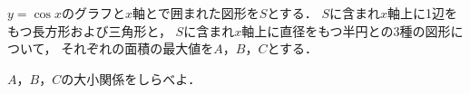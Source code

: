 \documentclass[../../main.tex]{subfiles}
\begin{document}
$y=\cos x$のグラフと$x$軸とで囲まれた図形を$S$とする．
$S$に含まれ$x$軸上に1辺をもつ長方形および三角形と，
$S$に含まれ$x$軸上に直径をもつ半円との3種の図形について，
それぞれの面積の最大値を$A$，$B$，$C$とする．

$A$，$B$，$C$の大小関係をしらべよ．
\end{document}
